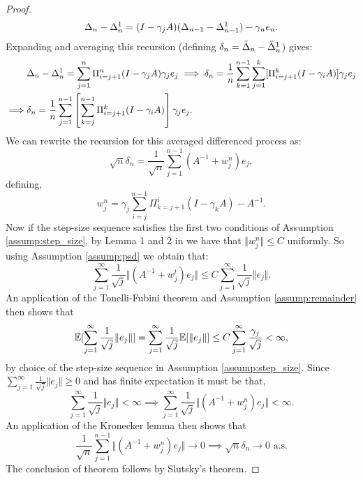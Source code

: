 \begin{proof}
\[
  \Delta_n - \Delta^1_{n} = (I-\gamma_j A)(\Delta_{n-1}-\Delta^1_{n-1}) - \gamma_n e_n. \notag
\]
Expanding and averaging this recursion (defining $\delta_n = \bar{\Delta}_n-\bar{\Delta}^1_{n}$) gives:
\begin{align}
   & \Delta_n-\Delta^1_{n} = \sum_{j=1}^{n} \Pi_{i=j+1}^{n}(I-\gamma_j A) \gamma_j e_j \implies \delta_n = \frac{1}{n} \sum_{k=1}^{n-1} \sum_{j=1}^{k}[\Pi_{i=j+1}^{k}(I-\gamma_i A)] \gamma_j e_j \notag \\
   \implies
   & \delta_n = \frac{1}{n} \sum_{j=1}^{n-1} \left[ \sum_{k=j}^{n-1} \Pi_{i=j+1}^{k}(I-\gamma_i A) \right] \gamma_j e_j. \notag
\end{align}
We can rewrite the recursion for this averaged differenced process as:
\[
  \sqrt{n}\delta_n =  \frac{1}{\sqrt{n}} \sum_{j=1}^{n-1}(A^{-1} + w_j^n)e_j,
\]
defining,
\[
  w_j^n = \gamma_j \sum_{i=j}^{n-1} \Pi_{k=j+1}^{i} (I-\gamma_k A) - A^{-1}.
\]
Now if the step-size sequence satisfies the first two conditions of Assumption \ref{assump:step_size}, by Lemma 1 and 2 in \citet{polyak1992acceleration}
we have that $\Vert w_j^n \Vert \leq C$ uniformly. So using Assumption \ref{assump:psd} we obtain that:
\[
  \sum_{j=1}^{\infty} \frac{1}{\sqrt{j}} \Vert (A^{-1}+w_j^t) e_j\Vert \leq C \sum_{j=1}^{\infty} \frac{1}{\sqrt{j}} \Vert e_j \Vert.
\]
An application of the Tonelli-Fubini theorem and Assumption \ref{assump:remainder} then shows that
\[
  \mathbb{E}[\sum_{j=1}^{\infty} \frac{1}{\sqrt{j}} \Vert e_j \Vert] = \sum_{j=1}^{\infty} \frac{1}{\sqrt{j}} \mathbb{E} [\Vert e_j \Vert] \leq C \sum_{j=1}^{\infty} \frac{\gamma_j}{\sqrt{j}} < \infty,
\]
by choice of the step-size sequence in Assumption \ref{assump:step_size}. Since $\sum_{j=1}^{\infty} \frac{1}{\sqrt{j}} \Vert e_j \Vert \geq 0$ and has finite expectation it must be that,
\[
  \sum_{j=1}^{\infty} \frac{1}{\sqrt{j}} \Vert e_j \Vert < \infty \implies \sum_{j=1}^{\infty} \frac{1}{\sqrt{j}}\Vert (A^{-1} + w_j^n)e_j \Vert < \infty.
\]
An application of the Kronecker lemma then shows that
\[
  \frac{1}{\sqrt{n}} \sum_{j=1}^{n-1} \Vert (A^{-1} + w_j^n)e_j \Vert \to 0 \implies \sqrt{n} \delta_n \to 0 \text{ a.s.}
\]
The conclusion of theorem follows by Slutsky's theorem.
\end{proof}
